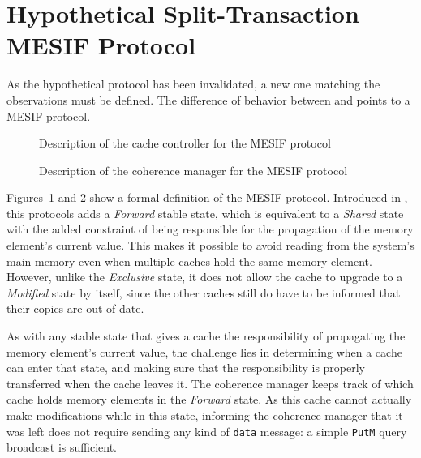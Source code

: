 \section{Hypothetical Split-Transaction MESIF Protocol}
\label{sec:identification:mesif}
As the hypothetical protocol has been invalidated, a new one matching the
observations must be defined. The difference of behavior between \benchs{}
and \benchx{} points to a MESIF protocol.

\begin{figure}[htb!]
\begin{center}
\resizebox{\textwidth}{!}{%

}
\end{center}
\caption{Description of the cache controller for the MESIF protocol}
\label{fig:mesif_cc_table}
\end{figure}

\begin{figure}[htb!]
\begin{center}
\resizebox{\textwidth}{!}{%

}
\end{center}
\caption{Description of the coherence manager for the MESIF protocol}
\label{fig:mesif_cmgr_table}
\end{figure}

Figures~\ref{fig:mesif_cc_table} and \ref{fig:mesif_cmgr_table} show a formal
definition of the MESIF protocol.  Introduced in \cite{mesif}, this protocols
adds a \textit{Forward} stable state, which is equivalent to a \textit{Shared}
state with the added constraint of being responsible for the propagation of the
memory element's current value.  This makes it possible to avoid reading from
the system's main memory even when multiple caches hold the same memory element.
However, unlike the \textit{Exclusive} state, it does not allow the cache to
upgrade to a \textit{Modified} state by itself, since the other caches still do
have to be informed that their copies are out-of-date.

As with any stable state that gives a cache the responsibility of propagating
the memory element's current value, the challenge lies in determining when a
cache can enter that state, and making sure that the responsibility is properly
transferred when the cache leaves it. The coherence manager keeps track of which
cache holds memory elements in the \textit{Forward} state. As this cache cannot
actually make modifications while in this state, informing the coherence manager
that it was left does not require sending any kind of \texttt{data} message: a
simple \texttt{PutM} query broadcast is sufficient.

